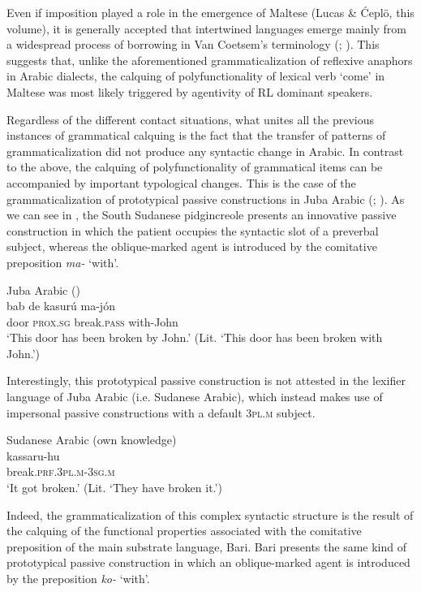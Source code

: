 \documentclass[output=paper]{langsci/langscibook}
\begin{document}
Even if imposition played a role in the emergence of Maltese (Lucas \& Ćeplö, this volume), it is generally accepted that intertwined languages emerge mainly from a widespread process of borrowing in Van Coetsem’s terminology (\citealt[397]{Winford2005}; \citealt{Manfredi2018}). This suggests that, unlike the aforementioned grammaticalization of reflexive anaphors in Arabic dialects, the calquing of polyfunctionality of lexical verb ‘come’ in Maltese was most likely triggered by agentivity of RL dominant speakers. 

Regardless of the different contact situations, what unites all the previous instances of grammatical calquing is the fact that the transfer of patterns of grammaticalization did not produce any syntactic change in Arabic. In contrast to the above, the calquing of polyfunctionality of grammatical items can be accompanied by important typological changes. This is the case of the grammaticalization of prototypical passive constructions in Juba Arabic (\citealt[92]{Manfredi2017}; \citeyear[415]{Manfredi2018}). As we can see in , the South Sudanese pidgincreole presents an innovative passive construction in which the patient occupies the syntactic slot of a preverbal subject, whereas the oblique-marked agent is introduced by the comitative preposition \textit{ma-} ‘with’.  

\ea\label{ex:key:passive}
{Juba Arabic (\citealt[86]{Manfredi2017})}\\
\gll   bab de kasurú ma-jón \\
       door \textsc{prox.sg} break.\textsc{pass} with-John\\
\glt   `This door has been broken by John.' (Lit. ‘This door has been broken with John.’)
\z
 
Interestingly, this prototypical passive construction is not attested in the lexifier language of Juba Arabic (i.e. Sudanese Arabic), which instead makes use of impersonal passive constructions with a default \textsc{3pl.m} subject.

\ea\label{ex:key:}
{Sudanese Arabic (own knowledge)}\\
\gll   kassaru-hu\\
       break.\textsc{prf.3pl.m-3sg.m}\\
\glt   `It got broken.' (Lit. ‘They have broken it.’) 
\z

Indeed, the grammaticalization of this complex syntactic structure is the result of the calquing of the functional properties associated with the comitative preposition of the main substrate language, Bari. Bari presents the same kind of prototypical passive construction in which an oblique-marked agent is introduced by the preposition \textit{ko-} ‘with’.
\end{document}
